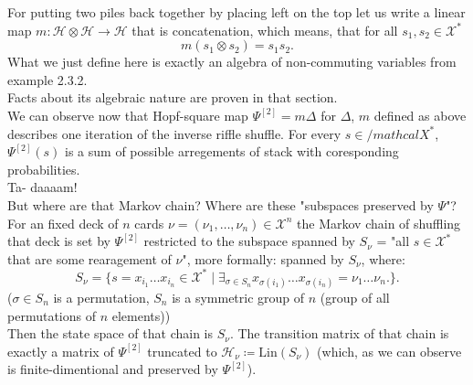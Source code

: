 \documentclass[a4paper, 12pt]{report}
\begin{document}
For putting two piles back together by placing left on the top let us write a linear map 
$m : \mathcal{H} \otimes \mathcal{H} \to \mathcal{H}$ that is concatenation, which means, that 
for all $s_1, s_2 \in \mathcal{X}^*$
\begin{equation*}
m(s_1 \otimes s_2) = s_1s_2.
\end{equation*}
What we just define here is exactly an algebra of non-commuting variables from example 
2.3.2.\\
Facts about its algebraic nature are proven in that section. \\
We can observe now that Hopf-square map $\Psi^{[2]} = m\Delta$ for $\Delta$, $m$ defined as above 
describes one iteration of the inverse riffle shuffle. For every $s \in /mathcal{X}^*$, $\Psi^{[2]}(s)$ is 
a sum of possible arregements of stack with coresponding probabilities. \\ Ta- daaaam! \\[4pt]
But where are that Markov chain? Where are these "subspaces preserved by $\Psi$"? \\
For an fixed deck of $n$ cards $\nu = (\nu_1, \dots, \nu_n) \in \mathcal{X}^n$ the Markov chain of shuffling 
that deck is set by $\Psi^{[2]}$ restricted to the subspace spanned by $S_\nu$ = "all $s \in \mathcal{X}^*$ 
that are some rearagement of $\nu$", more formally: spanned by $S_\nu$, where:
\begin{equation*}
S_\nu = \{ s = x_{i_1}\dots x_{i_n} \in \mathcal{X}^* \mid
\exists_{\sigma \in S_n} x_{\sigma(i_1)}\dots x_{\sigma(i_n)} = \nu_1\dots \nu_n. \}.
\end{equation*}
($\sigma \in S_n$ is a permutation, $S_n$ is a symmetric group of $n$ (group of 
all permutations of $n$ elements))\\
Then the state space of that chain is $S_\nu$. The transition matrix of that chain is exactly a matrix of 
$\Psi^{[2]}$ truncated to $\mathcal{H}_\nu \coloneqq \mathrm{Lin}(S_\nu)$ 
(which, as we can observe is finite-dimentional and preserved by $\Psi^{[2]}$). \\[8pt]
\end{document}
